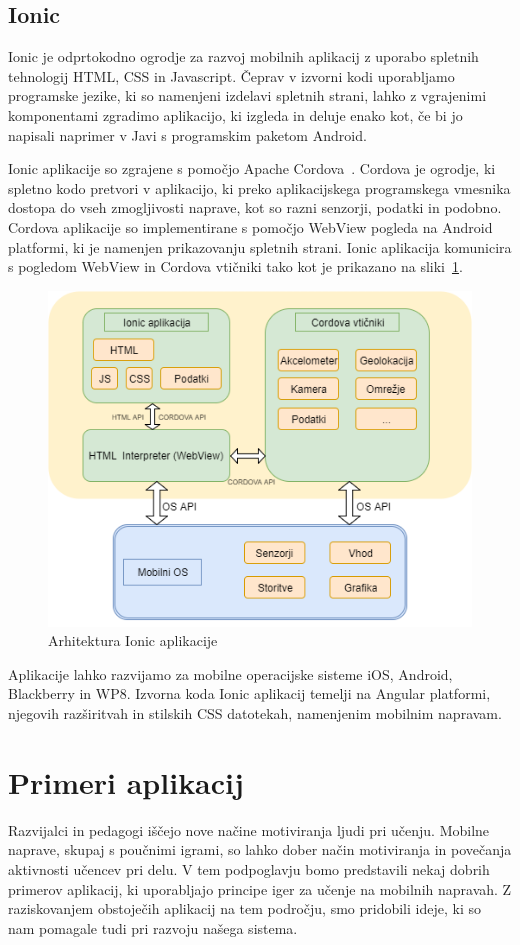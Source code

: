 \documentclass[a4paper, 12pt]{book}
\begin{document}
\subsection{Ionic}
Ionic je odprtokodno ogrodje za razvoj mobilnih aplikacij z uporabo spletnih tehnologij HTML, CSS in Javascript. Čeprav v izvorni kodi uporabljamo programske jezike, ki so namenjeni izdelavi spletnih strani, lahko z vgrajenimi komponentami zgradimo aplikacijo, ki izgleda in deluje enako kot, če bi jo napisali naprimer v Javi s programskim paketom Android.

Ionic aplikacije so zgrajene s pomočjo Apache Cordova~\cite{cordova}. Cordova je ogrodje, ki spletno kodo pretvori v aplikacijo, ki preko aplikacijskega programskega vmesnika dostopa do vseh zmogljivosti naprave, kot so razni senzorji, podatki in podobno. Cordova aplikacije so implementirane s pomočjo WebView pogleda na Android platformi, ki je namenjen prikazovanju spletnih strani. Ionic aplikacija komunicira s pogledom WebView in Cordova vtičniki tako kot je prikazano na sliki~\ref{ionicArch}.
\begin{figure}[H]
\centering
\includegraphics[height=0.7\textwidth]{slike/ionicArch}
\caption{Arhitektura Ionic aplikacije}\label{ionicArch}
\end{figure}

\noindent Aplikacije lahko razvijamo za mobilne operacijske sisteme iOS, Android, Blackberry in WP8. Izvorna koda Ionic aplikacij temelji na Angular platformi, njegovih razširitvah in stilskih CSS datotekah, namenjenim mobilnim napravam.

\section{Primeri aplikacij}
Razvijalci in pedagogi iščejo nove načine motiviranja ljudi pri učenju. Mobilne naprave, skupaj s poučnimi igrami, so lahko dober način motiviranja in povečanja aktivnosti učencev pri delu. V tem podpoglavju bomo predstavili nekaj dobrih primerov aplikacij, ki uporabljajo principe iger za učenje na mobilnih napravah. Z raziskovanjem obstoječih aplikacij na tem področju, smo pridobili ideje, ki so nam pomagale tudi pri razvoju našega sistema. 
\end{document}
